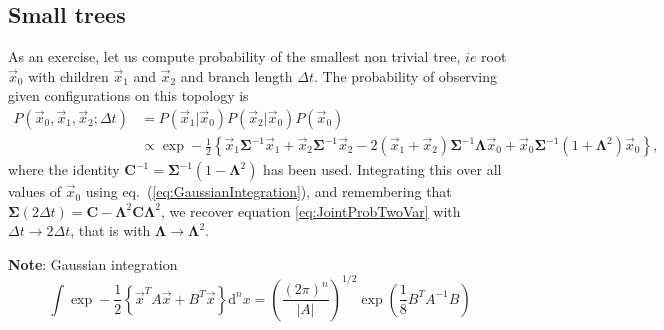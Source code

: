 \documentclass[10pt]{article}
\newcommand{\ddroit}{\textrm{d}}
\newcommand{\xz}{\vec{x}_0}
\newcommand{\xo}{\vec{x}_1}
\newcommand{\xt}{\vec{x}_2}
\newcommand{\Lam}{\bm{\Lambda}}
\newcommand{\Sig}{\bm{\Sigma}}
\begin{document}

\subsection{Small trees} %
\label{sub:small_trees}

As an exercise, let us compute probability of the smallest non trivial tree, $ie$ root $\xz$ with children $\xo$ and $\xt$ and branch length $\Delta t$. The probability of observing given configurations on this topology is 
\begin{equation}
  \begin{split}
    P(\xz,\xo,\xt ; \Delta t) &= P(\xo\vert\xz)P(\xt\vert\xz)P(\xz)\\
    &\propto\exp-\frac{1}{2}\left\{ \xo\Sig^{-1}\xo + \xt\Sig^{-1}\xt - 2(\xo + \xt)\Sig^{-1}\Lam\xz + \xz\Sig^{-1}(1+\Lam^2)\xz \right\},
  \end{split}
\end{equation}
where the identity $\bm{C}^{-1} = \Sig^{-1}(1-\Lam^2)$ has been used.
Integrating this over all values of $\xz$ using eq.~(\ref{eq:GaussianIntegration}), and remembering that $\Sig(2\Delta t) = \bm{C} - \Lam^2\bm{C}\Lam^2$, we recover equation \ref{eq:JointProbTwoVar} with $\Delta t \rightarrow 2\Delta t$, that is with $\Lam\rightarrow\Lam^2$.

\textbf{Note}: Gaussian integration
\begin{equation}
  \label{eq:GaussianIntegration}
  \int\exp-\frac{1}{2}\left\{\vec{x}^TA\vec{x} + B^T\vec{x}\right\}\ddroit^{n}x = \left( \frac{(2\pi)^n}{\vert A\vert} \right)^{1/2}\exp\left(\frac{1}{8}B^TA^{-1}B\right)
\end{equation}
\end{document}

